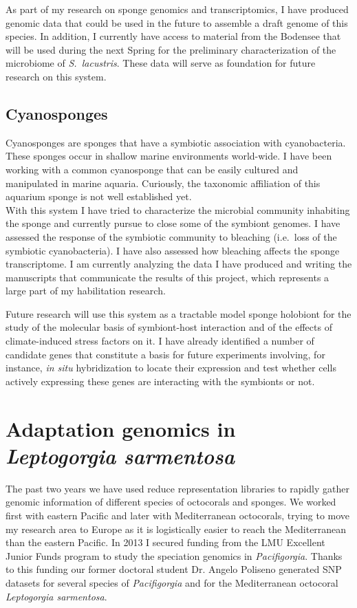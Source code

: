 \documentclass[a4paper,11pt]{article}
\begin{document}
As part of my research on sponge genomics and transcriptomics, I have produced genomic data that could be used in the future to assemble a draft genome of this species. In addition, I currently have access to material from the Bodensee that will be used during the next Spring for the preliminary characterization of the microbiome of \emph{S.~lacustris}. These data will serve as foundation for future research on this system.

\subsection*{Cyanosponges}

Cyanosponges are sponges that have a symbiotic association with cyanobacteria. These sponges occur in shallow marine environments world-wide. I have been working with a common cyanosponge that can be easily cultured and manipulated in marine aquaria. Curiously, the taxonomic affiliation of this aquarium sponge is not well established yet.\\

With this system I have tried to characterize the microbial community inhabiting the sponge and currently pursue to close some of the symbiont genomes. I have assessed the response of the symbiotic community to bleaching (i.e.~loss of the symbiotic cyanobacteria). I have also assessed how bleaching affects the sponge transcriptome. I am currently analyzing the data I have produced and writing the manuscripts that communicate the results of this project, which represents a large part of my habilitation research.

Future research will use this system as a tractable model sponge holobiont for the study of the molecular basis of symbiont-host interaction and of the effects of climate-induced stress factors on it. I have already identified a number of candidate genes that constitute a basis for future experiments involving, for instance, \emph{in situ} hybridization to locate their expression and test whether cells actively expressing these genes are interacting with the symbionts or not.

\section*{Adaptation genomics in \emph{Leptogorgia sarmentosa}}

The past two years we have used reduce representation libraries to rapidly gather genomic information of different species of octocorals and sponges. We worked first with eastern Pacific and later with Mediterranean octocorals, trying to move my research area to Europe as it is logistically easier to reach the Mediterranean than the eastern Pacific. In 2013 I secured funding from the LMU Excellent Junior Funds program to study the speciation genomics in \emph{Pacifigorgia}. Thanks to this funding our former doctoral student Dr. Angelo Poliseno generated SNP datasets for several species of \emph{Pacifigorgia} and for the Mediterranean octocoral \emph{Leptogorgia sarmentosa}.\\
\end{document}
